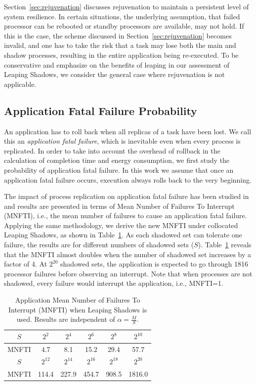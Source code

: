 Section~\ref{sec:rejuvenation} discusses rejuvenation to maintain a persistent level of system resilience. In certain situations, the underlying assumption, that failed processor can be rebooted or standby processors are available, may not hold. If this is the case, the scheme discussed in Section~\ref{sec:rejuvenation} becomes invalid, and one has to take the risk that a task may lose both the main and shadow processes, resulting in the entire application being re-executed. To be conservative and emphasize on the benefits of leaping in our assessment of Leaping Shadows, we consider the general case where rejuvenation is not applicable. 

\subsection{Application Fatal Failure Probability}
\label{sec:anal_app_fail}
An application has to roll back when all replicas of a task have been lost. We call this an \textit{application fatal failure}, which is inevitable even when every process is replicated. 
In order to take into account the overhead of rollback in the calculation of completion time and energy consumption, we first 
study the probability of application fatal failure. In this work we assume that once an application fatal failure occurs, execution always rolls back to the very 
beginning. 

The impact of process replication on application fatal failure has been studied in~\cite{casanova_inria_2012} and 
results are presented in terms of Mean Number of Failures To Interrupt (MNFTI), i.e., the mean number of failures to cause an application fatal failure.
Applying the same methodology, we derive the new MNFTI
under collocated Leaping Shadows, 
as shown in Table~\ref{tbl:mnfti}. As each shadowed set can tolerate one failure, the results are 
for different numbers of shadowed sets ($S$). Table~\ref{tbl:mnfti} reveals that the MNFTI almost doubles when the number of shadowed set increases by a factor of 4. At $2^{20}$ shadowed sets, the application is expected to go through 1816 processor failures before observing an interrupt. 
Note that when processes are not shadowed, every failure would interrupt the application, i.e., MNFTI=1. 


\begin{table}[!h]
	\caption{Application Mean Number of Failures To Interrupt (MNFTI) when Leaping Shadows is used. Results are independent of $\alpha=\frac{M}{S}$. }
	\centering
	\small
	\begin{tabular}{|c  |c|c|c|c|c|}
		\hline
		$S$ &  $2^{2}$ &  $2^{4}$ &  $2^{6}$ & $2^8$ & $2^{10}$ \\ 
		\hline
		MNFTI &  4.7 & 8.1 & 15.2 & 29.4 & 57.7 \\
		\hline\hline
		$S$ & $2^{12}$ & $2^{14}$ &  $2^{16}$  & $2^{18}$ & $2^{20}$ \\
		\hline
		MNFTI & 114.4 & 227.9 & 454.7 & 908.5  & 1816.0 \\
		\hline
	\end{tabular}
	\label{tbl:mnfti}
\end{table}


